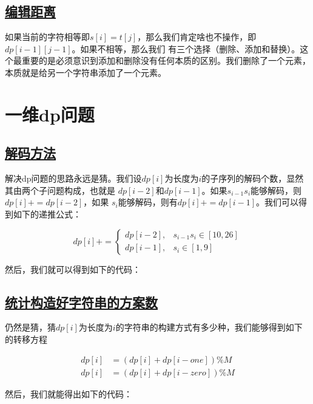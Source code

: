 \documentclass[../../main.tex]{subfiles}
\begin{document}
\subsection{\href{https://leetcode.cn/problems/edit-distance/}{编辑距离}}

如果当前的字符相等即$s[i] = t[j]$，那么我们肯定啥也不操作，即$dp[i - 1][j -1]$。如果不相等，那么我们
有三个选择（删除、添加和替换）。这个最重要的是必须意识到添加和删除没有任何本质的区别。我们删除了一个元素，
本质就是给另一个字符串添加了一个元素。

\section{一维dp问题}

\subsection{\href{https://leetcode.cn/problems/decode-ways/}{解码方法}}

解决dp问题的思路永远是猜。我们设$dp[i]$为长度为$i$的子序列的解码个数，显然其由两个子问题构成，也就是
$dp[i - 2]$和$dp[i - 1]$。如果$s_{i -1}s_{i}$能够解码，则$dp[i] += dp[i - 2]$，如果
$s_{i}$能够解码，则有$dp[i] += dp[i - 1]$。我们可以得到如下的递推公式：

$$
dp[i] += \begin{cases}
  dp[i - 2], & s_{i - 1}s_{i} \in [10, 26] \\
  dp[i - 1], & s_{i} \in [1, 9]
\end{cases}
$$

然后，我们就可以得到如下的代码：



\subsection{\href{https://leetcode.cn/problems/count-ways-to-build-good-strings/}
{统计构造好字符串的方案数}}

仍然是猜，猜$dp[i]$为长度为$i$的字符串的构建方式有多少种，我们能够得到如下的转移方程

\begin{align*}
  dp[i] &= (dp[i] + dp[i - one]) \% M \\
  dp[i] &= (dp[i] + dp[i - zero]) \% M
\end{align*}

然后，我们就能得出如下的代码：


\end{document}
